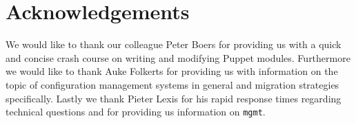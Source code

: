 \thispagestyle{acknowledgements}
\section*{Acknowledgements}\label{sec:acknowledgements}
We would like to thank our colleague Peter Boers for providing us with a quick and concise crash course on writing and modifying Puppet modules. Furthermore we would like to thank Auke Folkerts for providing us with information on the topic of configuration management systems in general and migration strategies specifically. Lastly we thank Pieter Lexis for his rapid response times regarding technical questions and for providing us information on \texttt{mgmt}.
